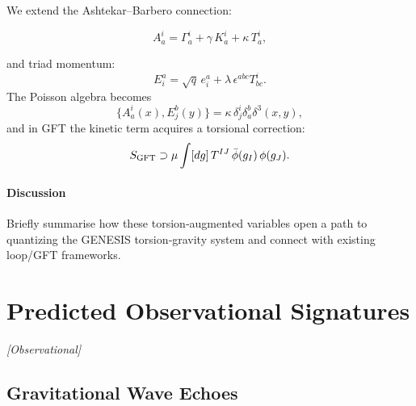 \documentclass{article}
\newcommand{\obstag}{\textcolor{green!60!black}{\textit{[Observational]}}}
\begin{document}
We extend the Ashtekar–Barbero connection:

\begin{equation}
  A^i_a = \Gamma^i_a + \gamma\,K^i_a + \kappa\,T^i_a,
\end{equation}

and triad momentum:
\begin{equation}\label{eq:auto156}
E^a_i = \sqrt{q}\,e^a_i + \lambda\,\epsilon^{abc}T_{bc}^i.
\end{equation}
The Poisson algebra becomes
\begin{equation}\label{eq:auto157}
\{A^i_a(x),E^b_j(y)\}=\kappa\,\delta^i_j\delta^b_a\delta^3(x,y),
\end{equation}
and in GFT the kinetic term acquires a torsional correction:
\begin{equation}\label{eq:auto158}
S_{\rm GFT}\supset \mu\int [dg]\,T^{IJ}\,\bar\phi(g_I)\,\phi(g_J).
\end{equation}

\paragraph{Discussion}
Briefly summarise how these torsion‐augmented variables open a path to quantizing
the GENESIS torsion‐gravity system and connect with existing loop/GFT frameworks.

\medskip
\begin{center}
\end{center}
\medskip


\section{Predicted Observational Signatures}
\label{sec:observational_tests}
\obstag

\subsection{Gravitational Wave Echoes}
\label{sec:gw_echoes}
\end{document}
